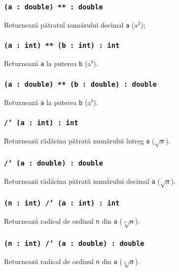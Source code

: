 \subsubsection{\texttt{(a : double) ** : double}}

Returnează pătratul numărului decimal \texttt{a} (a$^2$);

\subsubsection{\texttt{(a : int) ** (b : int) : int}}

Returnează \texttt{a} la puterea \texttt{b} (a$^b$).

\subsubsection{\texttt{(a : double) ** (b : double) : double}}

Returnează \texttt{a} la puterea \texttt{b} (a$^b$).

\subsubsection{\texttt{/' (a : int) : int}}

Returnează rădăcina pătrată numărului întreg \texttt{a} ($\sqrt{a}$).

\subsubsection{\texttt{/' (a : double) : double}}

Returnează rădăcina pătrată numărului decimal \texttt{a} ($\sqrt{a}$).

\subsubsection{\texttt{(n : int) /' (a : int) : int}}

Returnează radical de ordinul \texttt{n} din \texttt{a} ($\sqrt[n]{a}$).

\subsubsection{\texttt{(n : int) /' (a : double) : double}}

Returnează radical de ordinul \texttt{n} din \texttt{a} ($\sqrt[n]{a}$).

